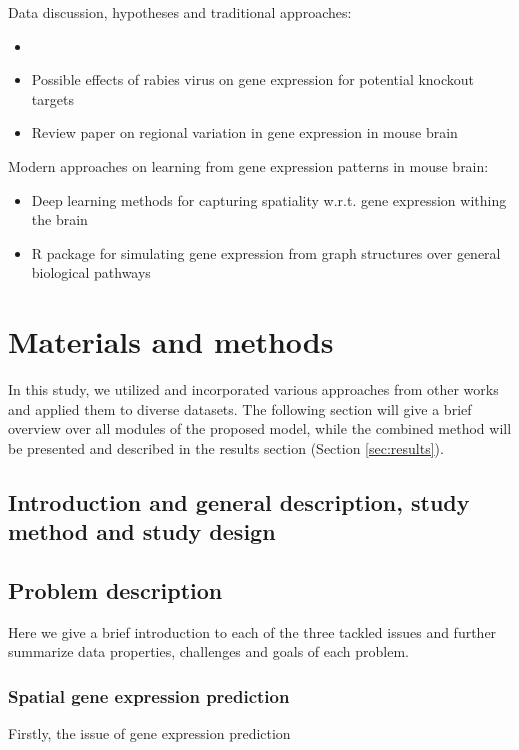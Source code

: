 \documentclass[]{article}
\renewcommand{\cite}{\citep}
\begin{document}
Data discussion, hypotheses and traditional approaches:
\begin{itemize}
	\item \cite{noauthor_clustering_nodate}
	\item Possible effects of rabies virus on gene expression\cite{prosniak_effect_2001} for potential knockout targets
	
	\item Review paper on regional variation in gene expression in mouse brain \cite{pavlidis_analysis_2001}
\end{itemize}

Modern approaches on learning from gene expression patterns in mouse brain:
\begin{itemize}
	\item Deep learning methods for capturing spatiality w.r.t. gene expression withing the brain \cite{zeng_deep_2015}
	\item R package for simulating gene expression from graph structures over general biological pathways \cite{kelly_graphsim_2020} 
\end{itemize}



\newpage
\section{Materials and methods}
\label{sec:methods}
In this study, we utilized and incorporated various approaches from other works and applied them to diverse datasets. The following section will give a brief overview over all modules of the proposed model, while the combined method will be presented and described in the results section (Section \ref{sec:results}).
\subsection*{Introduction and general description, study method and study design}
\subsection{Problem description}
Here we give a brief introduction to each of the three tackled issues and further summarize data properties, challenges and goals of each problem. 
\subsubsection{Spatial gene expression prediction}
Firstly, the issue of gene expression prediction 
\end{document}
